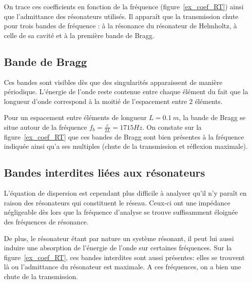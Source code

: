 On trace ces coefficients en fonction de la fréquence (figure~\ref{ex_coef_RT}) ainsi que l'admittance des résonateurs utilisés. Il apparaît que la transmission chute pour trois bandes de fréquence : à la résonance du résonateur de Helmholtz, à celle de sa cavité et à la première bande de Bragg.

\subsection{Bande de Bragg}
Ces bandes sont visibles dès que des singularités apparaissent de manière périodique. L'énergie de l'onde reste contenue entre chaque élément du fait que la longueur d'onde correspond à la moitié de l'espacement entre 2 éléments. 

Pour un espacement entre éléments de longueur $L=0.1~m$, la bande de Bragg se situe autour de la fréquence $f_{b} = \frac{c}{2L} = 1715 Hz$. On constate sur la figure~\ref{ex_coef_RT} que ces bandes de Bragg sont bien présentes à la fréquence indiquée ainsi qu'a ses multiples (chute de la transmission et réflexion maximale).
 

\subsection{Bandes interdites liées aux résonateurs}
L'équation de dispersion est cependant plus difficile à analyser qu'il n'y paraît en raison des résonateurs qui constituent le réseau. Ceux-ci ont une impédance négligeable dès lors que la fréquence d'analyse se trouve suffisamment éloignée des fréquences de résonance. 

De plus, le résonateur étant par nature un système résonant, il peut lui aussi induire une absorption de l'énergie de l'onde sur certaines fréquences. Sur la figure~\ref{ex_coef_RT}, ces bandes interdites sont aussi présentes: elles se trouvent là ou l'admittance du résonateur est maximale. A ces fréquences, on a bien une chute de la transmission.

